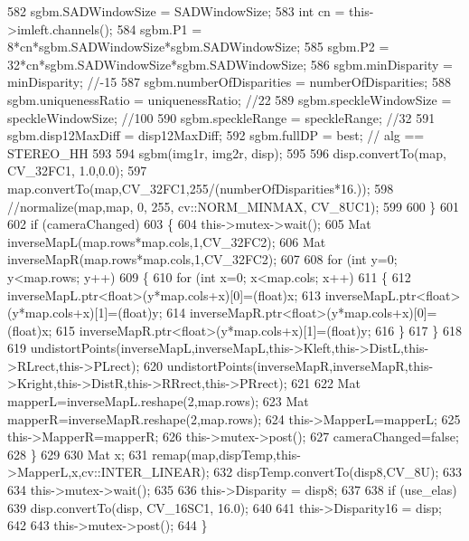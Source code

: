 \begin{DoxyCode}
582         sgbm.SADWindowSize =        SADWindowSize;
583         \textcolor{keywordtype}{int} cn =                    this->imleft.channels();
584         sgbm.P1 =                   8*cn*sgbm.SADWindowSize*sgbm.SADWindowSize;
585         sgbm.P2 =                   32*cn*sgbm.SADWindowSize*sgbm.SADWindowSize;
586         sgbm.minDisparity =         minDisparity; \textcolor{comment}{//-15}
587         sgbm.numberOfDisparities =  numberOfDisparities;
588         sgbm.uniquenessRatio =      uniquenessRatio; \textcolor{comment}{//22}
589         sgbm.speckleWindowSize =    speckleWindowSize; \textcolor{comment}{//100}
590         sgbm.speckleRange =         speckleRange; \textcolor{comment}{//32}
591         sgbm.disp12MaxDiff =        disp12MaxDiff;
592         sgbm.fullDP =               best; \textcolor{comment}{// alg == STEREO\_HH}
593 
594         sgbm(img1r, img2r, disp);
595 
596         disp.convertTo(map, CV\_32FC1, 1.0,0.0);
597         map.convertTo(map,CV\_32FC1,255/(numberOfDisparities*16.));
598         \textcolor{comment}{//normalize(map,map, 0, 255, cv::NORM\_MINMAX, CV\_8UC1);}
599 
600     \}
601     
602     \textcolor{keywordflow}{if} (cameraChanged)
603     \{
604         this->mutex->wait();
605         Mat inverseMapL(map.rows*map.cols,1,CV\_32FC2);
606         Mat inverseMapR(map.rows*map.cols,1,CV\_32FC2);
607 
608         \textcolor{keywordflow}{for} (\textcolor{keywordtype}{int} y=0; y<map.rows; y++)
609         \{
610             \textcolor{keywordflow}{for} (\textcolor{keywordtype}{int} x=0; x<map.cols; x++)
611             \{
612                 inverseMapL.ptr<\textcolor{keywordtype}{float}>(y*map.cols+x)[0]=(\textcolor{keywordtype}{float})x;
613                 inverseMapL.ptr<\textcolor{keywordtype}{float}>(y*map.cols+x)[1]=(\textcolor{keywordtype}{float})y;
614                 inverseMapR.ptr<\textcolor{keywordtype}{float}>(y*map.cols+x)[0]=(\textcolor{keywordtype}{float})x;
615                 inverseMapR.ptr<\textcolor{keywordtype}{float}>(y*map.cols+x)[1]=(\textcolor{keywordtype}{float})y;
616             \}
617         \}
618 
619         undistortPoints(inverseMapL,inverseMapL,this->Kleft,this->DistL,this->RLrect,this->PLrect);
620         undistortPoints(inverseMapR,inverseMapR,this->Kright,this->DistR,this->RRrect,this->PRrect);
621 
622         Mat mapperL=inverseMapL.reshape(2,map.rows);
623         Mat mapperR=inverseMapR.reshape(2,map.rows);
624         this->MapperL=mapperL;
625         this->MapperR=mapperR;
626         this->mutex->post();
627         cameraChanged=false;
628     \}
629 
630     Mat x;
631     remap(map,dispTemp,this->MapperL,x,cv::INTER\_LINEAR);
632     dispTemp.convertTo(disp8,CV\_8U); 
633 
634     this->mutex->wait();
635 
636     this->Disparity = disp8;
637 
638     if (use\_elas)
639         disp.convertTo(disp, CV\_16SC1, 16.0);
640 
641     this->Disparity16 = disp;
642 
643     this->mutex->post();
644 \}
\end{DoxyCode}
